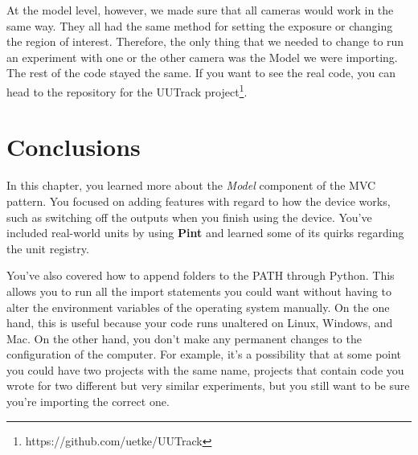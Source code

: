 At the model level, however, we made sure that all cameras would work in the same way. They all had the same method for setting the exposure or changing the region of interest. Therefore, the only thing that we needed to change to run an experiment with one or the other camera was the Model we were importing. The rest of the code stayed the same. If you want to see the real code, you can head to the repository for the UUTrack project\footnote{https://github.com/uetke/UUTrack}.

\section{Conclusions}\label{sec:device-model-conclusions2}
In this chapter, you learned more about the \emph{Model} component of the {MVC} pattern. You focused on adding features with regard to how the device works, such as switching off the outputs when you finish using the device. You've included real-world units by using \textbf{Pint} and learned some of its quirks regarding the unit registry.

You've also covered how to append folders to the PATH through Python. This allows you to run all the import statements you could want without having to alter the environment variables of the operating system manually. On the one hand, this is useful because your code runs unaltered on Linux, Windows, and Mac. On the other hand, you don't make any permanent changes to the configuration of the computer. For example, it's a possibility that at some point you could have two projects with the same name, projects that contain code you wrote for two different but very similar experiments, but you still want to be sure you're importing the correct one.
